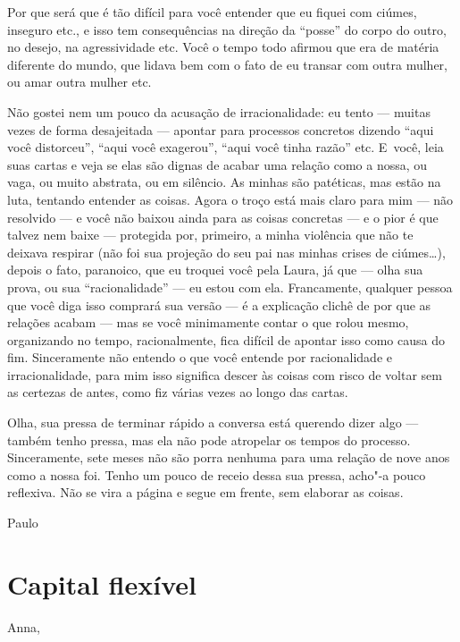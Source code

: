 Por que será que é tão difícil para você entender que eu fiquei com
ciúmes, inseguro etc., e isso tem consequências na direção da ``posse''
do corpo do outro, no desejo, na agressividade etc. Você o tempo todo
afirmou que era de matéria diferente do mundo, que lidava bem com o fato
de eu transar com outra mulher, ou amar outra mulher etc.

Não gostei nem um pouco da acusação de irracionalidade: eu tento ---
muitas vezes de forma desajeitada --- apontar para processos concretos
dizendo ``aqui você distorceu'', ``aqui você exagerou'', ``aqui você
tinha razão'' etc. E~você, leia suas cartas e veja se elas são dignas de
acabar uma relação como a nossa, ou vaga, ou muito abstrata, ou em
silêncio. As minhas são patéticas, mas estão na luta, tentando entender
as coisas. Agora o troço está mais claro para mim --- não resolvido ---
e você não baixou ainda para as coisas concretas --- e o pior é que
talvez nem baixe --- protegida por, primeiro, a minha violência que não
te deixava respirar (não foi sua projeção do seu pai nas minhas crises
de ciúmes…), depois o fato, paranoico, que eu troquei você pela
Laura, já que --- olha sua prova, ou sua ``racionalidade'' --- eu estou
com ela. Francamente, qualquer pessoa que você diga isso comprará sua
versão --- é a explicação clichê de por que as relações acabam --- mas
se você minimamente contar o que rolou mesmo, organizando no tempo,
racionalmente, fica difícil de apontar isso como causa do fim.
Sinceramente não entendo o que você entende por racionalidade e
irracionalidade, para mim isso significa descer às coisas com risco de
voltar sem as certezas de antes, como fiz várias vezes ao longo das
cartas.

Olha, sua pressa de terminar rápido a conversa está querendo dizer algo
--- também tenho pressa, mas ela não pode atropelar os tempos do
processo. Sinceramente, sete meses não são porra nenhuma para uma
relação de nove anos como a nossa foi. Tenho um pouco de receio dessa
sua pressa, acho"-a pouco reflexiva. Não se vira a página e segue em
frente, sem elaborar as coisas.

\begin{flushright}Paulo\end{flushright}


\chapter{Capital flexível}

Anna,

\medskip{} 

